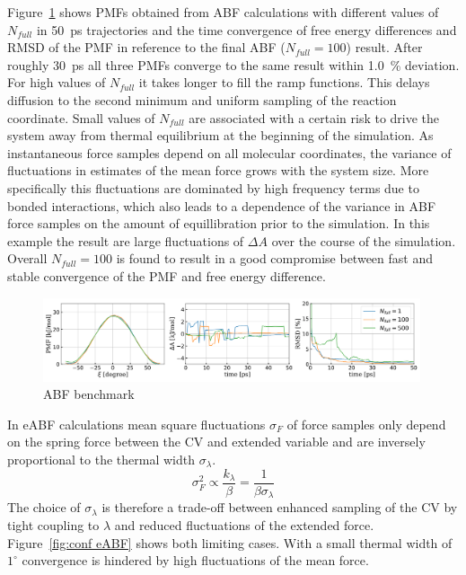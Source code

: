 Figure~\ref{fig:ABF benchmark} shows PMFs obtained from ABF calculations with different values of $N_{full}$ in 50~ps trajectories and the time convergence of free energy differences and RMSD of the PMF in reference to the final ABF ($N_{full}=100$) result.
After roughly 30~ps all three PMFs converge to the same result within 1.0~\% deviation.
For high values of $N_{full}$ it takes longer to fill the ramp functions.
This delays diffusion to the second minimum and uniform sampling of the reaction coordinate.
Small values of $N_{full}$ are associated with a certain risk to drive the system away from thermal equilibrium at the beginning of the simulation.
As instantaneous force samples depend on all molecular coordinates, the variance of fluctuations in estimates of the mean force grows with the system size.
More specifically this fluctuations are dominated by high frequency terms due to bonded interactions\autocite{lesage2017smoothed}, which also leads to a dependence of the variance in ABF force samples on the amount of equillibration prior to the simulation.\autocite{blondel2004ensemble}
In this example the result are large fluctuations of $\Delta A$ over the course of the simulation.
Overall $N_{full}=100$ is found to result in a good compromise between fast and stable convergence of the PMF and free energy difference.
\begin{figure}[H]
    \centering
    \includegraphics[width=0.99\textwidth]{bilder/benchmark/ABF_benchmark_nfull}
    \caption{ABF benchmark}
    \label{fig:ABF benchmark}
\end{figure}
In eABF calculations mean square fluctuations $\sigma_F$ of force samples only depend on the spring force between the CV and extended variable and are inversely proportional to the thermal width $\sigma_\lambda$.
\begin{equation}
    \sigma_F^2 \propto \frac{k_\lambda}{\beta} = \frac{1}{\beta\sigma_\lambda}
\end{equation}
The choice of $\sigma_\lambda$ is therefore a trade-off between enhanced sampling of the CV by tight coupling to $\lambda$ and reduced fluctuations of the extended force.\autocite{lesage2017smoothed}
Figure~\ref{fig:conf eABF} shows both limiting cases.
With a small thermal width of $1^\circ$ convergence is hindered by high fluctuations of the mean force.
